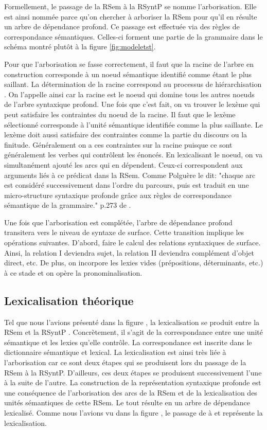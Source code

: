 Formellement, le passage de la RSem à la RSyntP se nomme l'arborisation. Elle est ainsi nommée  parce qu'on chercher à arboriser la RSem pour qu'il en résulte un arbre de dépendance profond. Ce passage est effectuée via des règles de correspondance sémantiques. Celles-ci forment une partie de la grammaire dans le schéma montré plutôt à la figure \ref{fig:modeletst}.

Pour que l'arborisation se fasse correctement, il faut que la racine de l'arbre en construction corresponde à un noeud sémantique identifié comme étant le plus saillant. La détermination de la racine correspond au processus de hiérarchisation \citep{PolguereStructurationmisejeu1990}. On l'appelle ainsi car la racine est le noeud qui domine tous les autres noeuds de l'arbre syntaxique profond. Une fois que c'est fait, on va trouver le lexème qui peut satisfaire les contraintes du noeud de la racine. Il faut que le lexème sélectionné corresponde à l'unité sémantique identifiée comme la plus saillante. Le lexème doit aussi satisfaire des contraintes comme la partie du discours ou la finitude. Généralement on a ces contraintes sur la racine puisque ce sont généralement les verbes qui contrôlent les énoncés. En lexicalisant le noeud, on va simultanément ajouté les arcs qui en dépendent. Ceux-ci correspondent aux arguments liés à ce prédicat dans la RSem. Comme Polguère le dit: "chaque arc est considéré successivement dans l'ordre du parcours, puis est traduit en une micro-structure syntaxique profonde grâce aux règles de correspondance sémantique de la grammaire." p.273 de \citep{PolguereStructurationmisejeu1990}. 

Une fois que l'arborisation est complétée, l'arbre de dépendance profond transitera vers le niveau de syntaxe de surface. Cette transition implique les opérations suivantes. D'abord, faire le calcul des relations syntaxiques de surface. Ainsi, la relation I deviendra sujet, la relation II deviendra complément d'objet direct, etc. De plus, on incorpore les lexies vides (prépositions, déterminants, etc.) à ce stade et on opère la pronominalisation. 

\subsection{Lexicalisation théorique}

Tel que nous l'avions présenté dans la figure , la lexicalisation se produit entre la RSem et la RSyntP \citep{PolguereStructurationmisejeu1990}. Concrètement, il s'agit de la correspondance entre une unité sémantique et les lexies qu'elle contrôle. La correspondance est inscrite dans le dictionnaire sémantique et lexical. La lexicalisation est ainsi très liée à l'arborisation car ce sont deux étapes qui se produisent lors du passage de la RSem à la RSyntP. D'ailleurs, ces deux étapes se produisent successivement l'une à la suite de l'autre. La construction de la représentation syntaxique profonde est une conséquence de l'arborisation des arcs de la RSem et de la lexicalisation des unités sémantiques de cette RSem. Le tout résulte en un arbre de dépendance lexicalisé. Comme nous l'avions vu dans la figure , le passage de  à  et  représente la lexicalisation.

